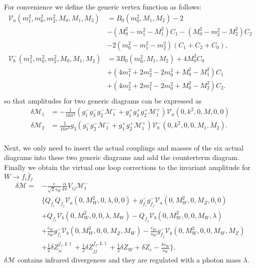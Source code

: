 For convenience we define the generic vertex function as follows:
\begin{align}
\mathcal{V}_a(m_1^2,m_0^2,m_2^2,M_0,M_1,M_2)&=B_0(m_0^2,M_1,M_2)-2\nonumber\\
&-(M_0^2-m_1^2-M_1^2)C_1-(M_0^2-m_2^2-M_2^2)C_2\nonumber\\
&-2(m_0^2-m_1^2-m_2^2)(C_1+C_2+C_0),\nonumber\\
\mathcal{V}_b^-(m_1^2,m_0^2,m_2^2,M_0,M_1,M_2)&=3B_0(m_0^2,M_1,M_2)+4M_0^2C_0\nonumber\\
&+(4m_1^2+2m_2^2-2m_0^2+M_0^2-M_1^2)C_1\nonumber\\
&+(4m_2^2+2m_1^2-2m_0^2+M_0^2-M_2^2)C_2.\nonumber\\
\end{align}
so that amplitudes for two generic diagrams can be expressed as
\begin{align}
\delta\mathcal{M}_1&=-\frac{1}{16\pi^2}(g_1^-g_3^-
g_2^-\mathcal{M}^-_1+g_1^+g_3^+
g_2^+\mathcal{M}^+_1)\mathcal{V}_a(0,k^2,0,M,0,0)\nonumber\\
\delta\mathcal{M}_2&=\frac{1}{16\pi^2}g_3(g_1^-g_2^-\mathcal{M}_1^-+g_1^+g_2^+\mathcal{M}_1^+)\mathcal{V}_b^-(0,k^2,0,0,M_1,M_2).\nonumber\\
\end{align}

Next, we only need to insert the actual couplings and masses of the six actual diagrams into these two generic diagrams and add the counterterm diagram. Finally we obtain the virtual one loop corrections to the invariant amplitude for $W\to f_i\bar{f}_j$
\begin{align}
\delta\mathcal{M}=&-\frac{e}{\sqrt{2}s_W}\frac{\alpha}{4\pi}V_{ij}\mathcal{M}^-_1\nonumber\\
&\biggl\{Q_{f_i}Q_{f_j}\mathcal{V}_a(0,M^2_W,0,\lambda,0,0)+g^-_{f_i}g^-_{f_j}\mathcal{V}_a(0,M^2_W,0,M_Z,0,0)\nonumber\\
&+Q_{f_i}\mathcal{V}_b(0,M_W^2,0,0,\lambda,M_W)-Q_{f_j}\mathcal{V}_b(0,M_W^2,0,0,M_W,\lambda)\nonumber\\
&+\frac{c_W}{s_W}g^-_{f_i}\mathcal{V}_b(0,M_W^2,0,0,M_Z,M_W)-\frac{c_W}{s_W}g^-_{f_j}\mathcal{V}_b(0,M_W^2,0,0,M_W,M_Z)\nonumber\\
&+\frac{1}{2}\delta Z_{ii}^{f_i,L\dagger}+\frac{1}{2}\delta Z_{jj}^{f_j,L\dagger}+\frac{1}{2}\delta Z_W+\delta Z_e-\frac{\delta s_W}{s_W}
\biggr\}.
\end{align}
$\delta\mathcal{M}$ contains infrared divergences and they are regulated with a photon mass $\lambda$. 
